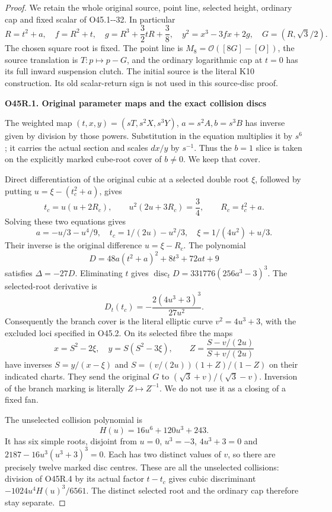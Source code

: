 \begin{proof}
\par\nobreak

We retain the whole original source, point line, selected height,
ordinary cap and fixed scalar of O45.1-\/-32. In particular
\[
 R=t^2+a,\quad f=R^2+t,\quad
 g=R^3+\frac32tR+\frac38,\quad
 y^2=x^3-3fx+2g,\quad G=(R,\sqrt3/2).
 \tag{O45R.1}
\]
The chosen square root is fixed. The point line is
\(M_8=\mathcal O([8G]-[O])\), the source translation is
\(T:p\mapsto p-G\), and the ordinary logarithmic cap
at \(t=0\) has its full inward suspension clutch.
The initial source is the literal K10 construction.
Its old scalar-return sign is not used in this source-disc proof.

\par

\medskip\noindent\textbf{O45R.1. Original parameter maps and the exact collision discs}

\par\nobreak

The weighted map
\((t,x,y)=(sT,s^2X,s^3Y)\), \(a=s^2A,b=s^3B\)
has inverse given by division by those powers. Substitution
in the equation multiplies it by \(s^6\); it carries the
actual section and scales \(dx/y\) by \(s^{-1}\).
Thus the \(b=1\) slice is taken on the explicitly marked
cube-root cover of \(b\ne0\). We keep that cover.

Direct differentiation of the original cubic at a selected
double root \(\xi\), followed by putting
\(u=\xi-(t_c^2+a)\), gives
\[
 t_c=u(u+2R_c),\qquad
 u^2(2u+3R_c)=\frac34,\qquad
 R_c=t_c^2+a .
 \tag{O45R.2}
\]
Solving these two equations gives
\[
 a=-u/3-u^4/9,\quad
 t_c=1/(2u)-u^2/3,\quad
 \xi=1/(4u^2)+u/3.
 \tag{O45R.3}
\]
Their inverse is the original difference \(u=\xi-R_c\).
The polynomial
\[
 D=48a(t^2+a)^2+8t^3+72at+9
 \tag{O45R.4}
\]
satisfies \(\Delta=-27D\). Eliminating \(t\) gives
\(\operatorname{disc}_tD=331776(256a^3-3)^3\).
The selected-root derivative is
\[
 D_t(t_c)=-\frac{2(4u^3+3)^3}{27u^2}.
 \tag{O45R.5}
\]
Consequently the branch cover is the literal elliptic curve
\(v^2=4u^3+3\), with the excluded loci specified in O45.2.
On its selected fibre the maps
\[
 x=S^2-2\xi,\quad y=S(S^2-3\xi),\qquad
 Z=\frac{S-v/(2u)}{S+v/(2u)}
 \tag{O45R.6}
\]
have inverses \(S=y/(x-\xi)\) and
\(S=(v/(2u))(1+Z)/(1-Z)\) on their indicated charts.
They send the original \(G\) to
\((\sqrt3+v)/(\sqrt3-v)\). Inversion of the branch marking
is literally \(Z\mapsto Z^{-1}\). We do not use it as a
closing of a fixed fan.

The unselected collision polynomial is
\[
 H(u)=16u^6+120u^3+243.
 \tag{O45R.7}
\]
It has six simple roots, disjoint from \(u=0\),
\(u^3=-3\), \(4u^3+3=0\) and
\(2187-16u^3(u^3+3)^3=0\). Each has two distinct
values of \(v\), so there are precisely twelve
marked disc centres. These are all the unselected
collisions: division of O45R.4 by its actual factor
\(t-t_c\) gives cubic discriminant
\(-1024u^4H(u)^3/6561\). The distinct selected
root and the ordinary cap therefore stay separate.


\end{proof}
